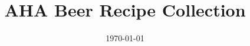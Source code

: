 \documentclass[10pt,oneside]{scrbook}
\begin{document}
\title{AHA Beer Recipe Collection}
\date{\today}
\maketitle

\frontmatter

\tableofcontents

\mainmatter
\twocolumn














\backmatter


\end{document}

